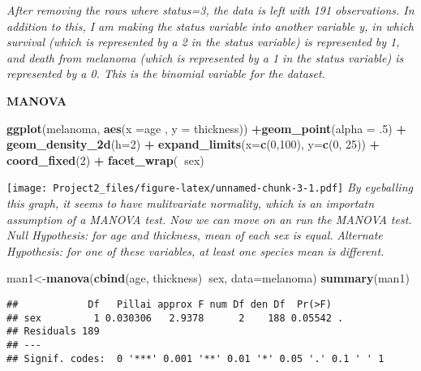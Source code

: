 \documentclass[]{article}
\newenvironment{Shaded}{\begin{snugshade}}{\end{snugshade}}
\newcommand{\DataTypeTok}[1]{\textcolor[rgb]{0.13,0.29,0.53}{#1}}
\newcommand{\DecValTok}[1]{\textcolor[rgb]{0.00,0.00,0.81}{#1}}
\newcommand{\FloatTok}[1]{\textcolor[rgb]{0.00,0.00,0.81}{#1}}
\newcommand{\KeywordTok}[1]{\textcolor[rgb]{0.13,0.29,0.53}{\textbf{#1}}}
\newcommand{\NormalTok}[1]{#1}
\newcommand{\OperatorTok}[1]{\textcolor[rgb]{0.81,0.36,0.00}{\textbf{#1}}}
\newcommand{\StringTok}[1]{\textcolor[rgb]{0.31,0.60,0.02}{#1}}
\begin{document}
\emph{After removing the rows where status=3, the data is left with 191
observations. In addition to this, I am making the status variable into
another variable y, in which survival (which is represented by a 2 in
the status variable) is represented by 1, and death from melanoma (which
is represented by a 1 in the status variable) is represented by a 0.
This is the binomial variable for the dataset.}

\textbf{MANOVA}

\begin{Shaded}
\begin{Highlighting}[]
\KeywordTok{ggplot}\NormalTok{(melanoma, }\KeywordTok{aes}\NormalTok{(}\DataTypeTok{x =}\NormalTok{age , }\DataTypeTok{y =}\NormalTok{ thickness)) }\OperatorTok{+}\KeywordTok{geom_point}\NormalTok{(}\DataTypeTok{alpha =} \FloatTok{.5}\NormalTok{) }\OperatorTok{+}\StringTok{ }\KeywordTok{geom_density_2d}\NormalTok{(}\DataTypeTok{h=}\DecValTok{2}\NormalTok{) }\OperatorTok{+}\StringTok{ }\KeywordTok{expand_limits}\NormalTok{(}\DataTypeTok{x=}\KeywordTok{c}\NormalTok{(}\DecValTok{0}\NormalTok{,}\DecValTok{100}\NormalTok{), }\DataTypeTok{y=}\KeywordTok{c}\NormalTok{(}\DecValTok{0}\NormalTok{, }\DecValTok{25}\NormalTok{)) }\OperatorTok{+}\StringTok{ }\KeywordTok{coord_fixed}\NormalTok{(}\DecValTok{2}\NormalTok{) }\OperatorTok{+}\StringTok{ }\KeywordTok{facet_wrap}\NormalTok{(}\OperatorTok{~}\NormalTok{sex) }
\end{Highlighting}
\end{Shaded}

\texttt{[image: Project2\_files/figure-latex/unnamed-chunk-3-1.pdf]}
\emph{By eyeballing this graph, it seems to have mulitvariate normality,
which is an importatn assumption of a MANOVA test. Now we can move on an
run the MANOVA test. } \emph{Null Hypothesis: for age and thickness,
mean of each sex is equal.} \emph{Alternate Hypothesis: for one of these
variables, at least one species mean is different.}

\begin{Shaded}
\begin{Highlighting}[]
\NormalTok{man1<-}\KeywordTok{manova}\NormalTok{(}\KeywordTok{cbind}\NormalTok{(age, thickness)}\OperatorTok{~}\NormalTok{sex, }\DataTypeTok{data=}\NormalTok{melanoma)}
\KeywordTok{summary}\NormalTok{(man1)}
\end{Highlighting}
\end{Shaded}

\begin{verbatim}
##            Df   Pillai approx F num Df den Df  Pr(>F)  
## sex         1 0.030306   2.9378      2    188 0.05542 .
## Residuals 189                                          
## ---
## Signif. codes:  0 '***' 0.001 '**' 0.01 '*' 0.05 '.' 0.1 ' ' 1
\end{verbatim}
\end{document}
